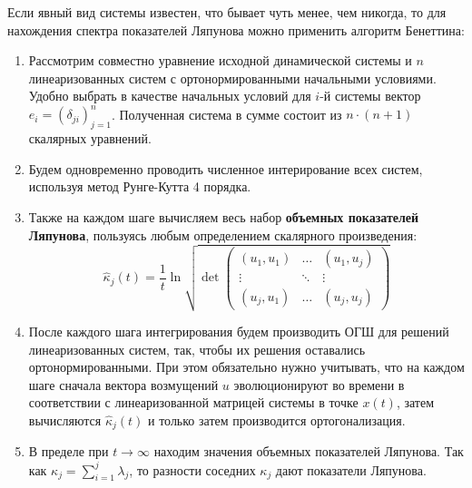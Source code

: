 Если явный вид системы известен, что бывает чуть менее, чем никогда, то для нахождения спектра показателей Ляпунова можно применить алгоритм Бенеттина:
\begin{enumerate}
\item
    Рассмотрим совместно уравнение исходной динамической системы и $n$ линеаризованных систем с ортонормированными начальными условиями.
    Удобно выбрать в качестве начальных условий для $i$-й системы вектор $e_i = \left( \delta_{ji} \right)_{j=1}^{n}$.
    Полученная система в сумме состоит из $n\cdot\left( n+1 \right)$ скалярных уравнений.
\item
    Будем одновременно проводить численное интерирование всех систем, используя метод Рунге-Кутта 4 порядка.
\item
    Также на каждом шаге вычисляем весь набор \textbf{объемных показателей Ляпунова}, пользуясь любым определением скалярного произведения:
    \begin{equation*}
        \hat{\kappa}_j(t) = \frac{1}{t} \ln \sqrt{\det \begin{pmatrix}
            \left( u_1, u_1 \right) & \dots & \left( u_1, u_j \right)\\
            \vdots & \ddots & \vdots\\
            \left( u_j, u_1 \right) & \dots & \left( u_j, u_j \right)
        \end{pmatrix} }
    \end{equation*}
\item
    После каждого шага интегрирования будем производить ОГШ для решений линеаризованных систем, так, чтобы их решения оставались ортонормированными.
    При этом обязательно нужно учитывать, что на каждом шаге сначала вектора возмущений $u$ эволюционируют во времени в соответствии с линеаризованной матрицей системы в точке $x(t)$, затем вычисляются $\hat{\kappa}_j(t)$ и только затем производится ортогонализация.
\item
    В пределе при $t \to \infty$ находим значения объемных показателей Ляпунова. Так как $\kappa_j = \sum_{i=1}^{j} \lambda_j$, то разности соседних $\kappa_j$ дают показатели Ляпунова.
\end{enumerate}

